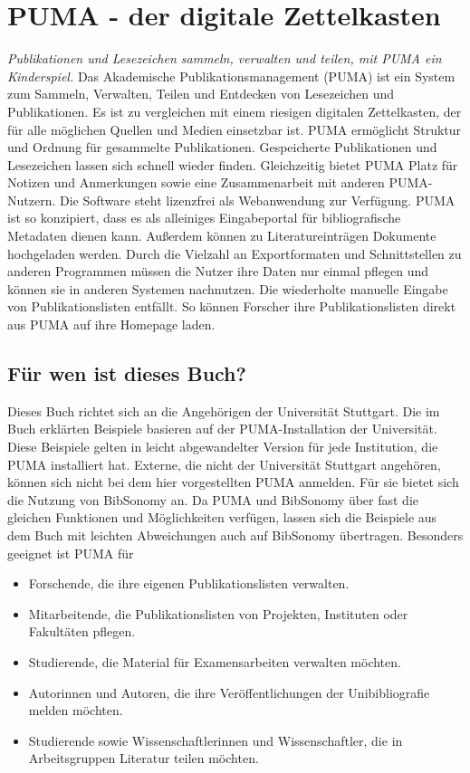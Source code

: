 \chapter{PUMA - der digitale Zettelkasten}
\textit{Publikationen und Lesezeichen sammeln, verwalten und teilen, mit PUMA ein Kinderspiel.}\newline
\newline
Das Akademische Publikationsmanagement (PUMA) ist ein System zum Sammeln, Verwalten, Teilen 
und Entdecken von Lesezeichen und Publikationen.\newline
Es ist zu vergleichen mit einem riesigen digitalen 
Zettelkasten, der für alle möglichen Quellen und Medien einsetzbar ist. PUMA 
ermöglicht Struktur und Ordnung für gesammelte Publikationen. Gespeicherte 
Publikationen und Lesezeichen lassen sich schnell wieder finden. Gleichzeitig 
bietet PUMA Platz für Notizen und Anmerkungen sowie eine Zusammenarbeit mit 
anderen PUMA-Nutzern. 
Die Software steht lizenzfrei als Webanwendung zur Verfügung.
\newline 
PUMA ist so konzipiert, dass es als alleiniges Eingabeportal für bibliografische Metadaten dienen kann. Außerdem können zu Literatureinträgen Dokumente hochgeladen werden. \newline
Durch die Vielzahl an Exportformaten und Schnittstellen zu anderen Programmen müssen die Nutzer ihre Daten nur einmal pflegen und können sie in anderen Systemen nachnutzen. Die wiederholte manuelle Eingabe von Publikationslisten entfällt. So können Forscher ihre Publikationslisten direkt aus PUMA auf ihre Homepage laden.  
\section{Für wen ist dieses Buch?} 
Dieses Buch richtet sich an die Angehörigen der Universität Stuttgart.
Die im Buch erklärten Beispiele basieren auf der PUMA-Installation der 
Universität. Diese Beispiele gelten in leicht abgewandelter 
Version für jede Institution, die PUMA installiert hat. 
\newline
Externe, die nicht der Universität Stuttgart angehören, können sich nicht bei 
dem hier vorgestellten PUMA anmelden. Für sie bietet sich die Nutzung 
von BibSonomy an. Da PUMA und BibSonomy über fast die gleichen Funktionen und 
Möglichkeiten verfügen, lassen sich die Beispiele aus dem Buch mit leichten 
Abweichungen auch auf BibSonomy übertragen.\newline
Besonders geeignet ist PUMA für
\begin{itemize}
\item Forschende, die ihre eigenen Publikationslisten verwalten.
\item Mitarbeitende, die Publikationslisten von Projekten, 
Instituten oder Fakultäten pflegen.
\item Studierende, die Material für Examensarbeiten verwalten 
möchten.
\item Autorinnen und Autoren, die ihre Veröffentlichungen der Unibibliografie 
melden möchten.
\item Studierende sowie Wissenschaftlerinnen und Wissenschaftler, 
die in Arbeitsgruppen Literatur teilen möchten.
\end{itemize}
